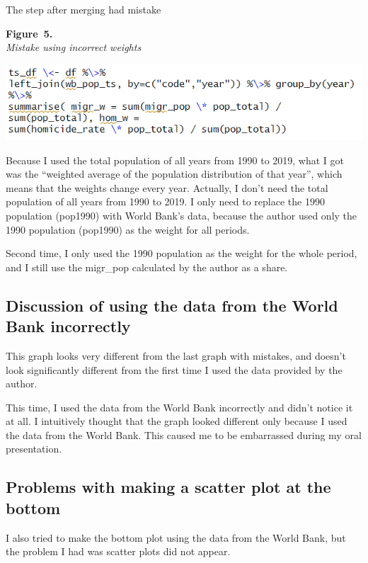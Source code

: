\documentclass[
  jou,
  floatsintext,
  longtable,
  nolmodern,
  notxfonts,
  notimes,
  colorlinks=true,linkcolor=blue,citecolor=blue,urlcolor=blue]{apa7}
\begin{document}
The step after merging had mistake

\label{fig:M1}
\textbf{Figure~5.}\\
\emph{Mistake using incorrect weights}

\begin{center}
\includegraphics[width=0.8\linewidth,height=\textheight,keepaspectratio]{fig/M1.png}
\end{center}
Because I used the total population of all years from 1990 to 2019, what
I got was the ``weighted average of the population distribution of that
year'', which means that the weights change every year. Actually, I
don't need the total population of all years from 1990 to 2019. I only
need to replace the 1990 population (pop1990) with World Bank's data,
because the author used only the 1990 population (pop1990) as the weight
for all periods.

Second time, I only used the 1990 population as the weight for the whole
period, and I still use the migr\_pop calculated by the author as a
share.

\subsection{Discussion of using the data from the World Bank
incorrectly}\label{discussion-of-using-the-data-from-the-world-bank-incorrectly}

This graph looks very different from the last graph with mistakes, and
doesn't look significantly different from the first time I used the data
provided by the author.

This time, I used the data from the World Bank incorrectly and didn't
notice it at all. I intuitively thought that the graph looked different
only because I used the data from the World Bank. This caused me to be
embarrassed during my oral presentation.

\subsection{Problems with making a scatter plot at the
bottom}\label{problems-with-making-a-scatter-plot-at-the-bottom}

I also tried to make the bottom plot using the data from the World Bank,
but the problem I had was scatter plots did not appear.
\end{document}
